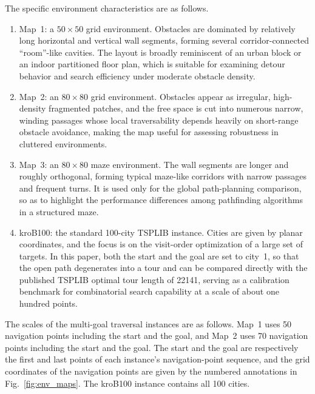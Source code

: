 \documentclass[lettersize,journal]{IEEEtran}
\begin{document}
The specific environment characteristics are as follows.

\begin{enumerate}

\item Map~1: a $50\times 50$ grid environment. Obstacles are dominated by relatively long horizontal and vertical wall segments, forming several corridor-connected ``room''-like cavities. The layout is broadly reminiscent of an urban block or an indoor partitioned floor plan, which is suitable for examining detour behavior and search efficiency under moderate obstacle density.

\item Map~2: an $80\times 80$ grid environment. Obstacles appear as irregular, high-density fragmented patches, and the free space is cut into numerous narrow, winding passages whose local traversability depends heavily on short-range obstacle avoidance, making the map useful for assessing robustness in cluttered environments.

\item Map~3: an $80\times 80$ maze environment. The wall segments are longer and roughly orthogonal, forming typical maze-like corridors with narrow passages and frequent turns. It is used only for the global path-planning comparison, so as to highlight the performance differences among pathfinding algorithms in a structured maze.

\item kroB100: the standard 100-city TSPLIB instance. Cities are given by planar coordinates, and the focus is on the visit-order optimization of a large set of targets. In this paper, both the start and the goal are set to city~1, so that the open path degenerates into a tour and can be compared directly with the published TSPLIB optimal tour length of 22141, serving as a calibration benchmark for combinatorial search capability at a scale of about one hundred points.

\end{enumerate}

The scales of the multi-goal traversal instances are as follows. Map~1 uses 50 navigation points including the start and the goal, and Map~2 uses 70 navigation points including the start and the goal. The start and the goal are respectively the first and last points of each instance's navigation-point sequence, and the grid coordinates of the navigation points are given by the numbered annotations in Fig.~\textcolor{blue}{\ref{fig:env_maps}}. The kroB100 instance contains all 100 cities.
\end{document}

